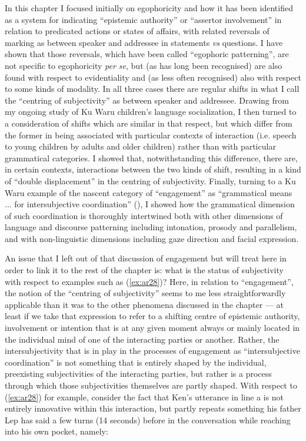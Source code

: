 \documentclass[output=paper]{langsci/langscibook}
\begin{document}
In this chapter I focused initially on egophoricity and how it has been identified as a system for indicating “epistemic authority” or “assertor involvement” in relation to predicated actions or states of affairs, with related reversals of marking as between speaker and addressee in statements \textit{vs} questions. I have shown that those reversals, which have been called “egophoric patterning”, are not specific to egophoricity \textit{per se}, but (as has long been recognised) are also found with respect to evidentiality and (as less often recognised) also with respect to some kinds of modality. In all three cases there are regular shifts in what I call the “centring of subjectivity” as between speaker and addressee. Drawing from my ongoing study of Ku Waru children’s language socialization, I then turned to a consideration of shifts which are similar in that respect, but which differ from the former in being associated with particular contexts of interaction (i.e. speech to young children by adults and older children) rather than with particular grammatical categories. I showed that, notwithstanding this difference, there are, in certain contexts, interactions between the two kinds of shift, resulting in a kind of “double displacement” in the centring of subjectivity.  Finally, turning to a Ku Waru example of the nascent category of “engagement” as “grammatical means ... for intersubjective coordination” (\citealt[112]{Evansetal2018}), I showed how the grammatical dimension of such coordination is thoroughly intertwined both with other dimensions of language and discourse patterning including intonation, prosody and parallelism, and with non-linguistic dimensions including gaze direction and facial expression.

An issue that I left out of that discussion of engagement but will treat here in order to link it to the rest of the chapter is: what is the status of subjectivity with respect to examples such as (\ref{ex:ar28})? Here, in relation to “engagement”, the notion of the “centring of subjectivity” seems to me less straightforwardly applicable than it was to the other phenomena discussed in the chapter — at least if we take that expression to refer to a shifting centre of epistemic authority, involvement or intention that is at any given moment always or mainly located in the individual mind of one of the interacting parties or another. Rather, the intersubjectivity that is in play in the processes of engagement as “intersubjective coordination” is not something that is entirely shaped by the individual, preexisting subjectivities of the interacting parties, but rather is a process through which those subjectivities themselves are partly shaped. With respect to (\ref{ex:ar28}) for example, consider the fact that Ken’s utterance in line a is not entirely innovative within this interaction, but partly repeats something his father Lep has said a few turns (14 seconds) before in the conversation while reaching into his own pocket, namely:
\end{document}
